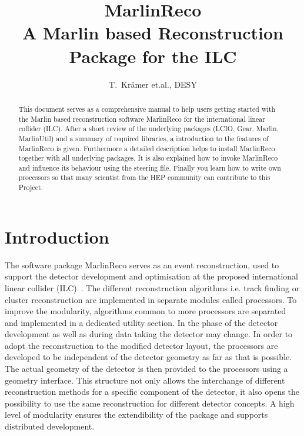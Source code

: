 \title{\huge{\bf MarlinReco}\\
             A Marlin based Reconstruction Package for the ILC}
\author{T.~Kr\"amer et.al., DESY}
\maketitle

\begin{abstract}
This document serves as a comprehensive manual to help
users getting started with the Marlin based reconstruction software MarlinReco
for the international linear collider (ILC).
After a short review of the underlying packages
(LCIO, Gear, Marlin, MarlinUtil) and a summary of required libraries,
a introduction to the features of MarlinReco is given.
Furthermore a detailed description helps to install MarlinReco
together with all underlying packages. It is also explained how
to invoke MarlinReco and influence its behaviour using the steering file.
Finally you learn how to write own processors so that many
scientist from the HEP community can contribute to this Project.
\end{abstract}
\newpage
\tableofcontents
\newpage

\section{Introduction}

The software package MarlinReco serves as an event reconstruction,
used to support the detector development and optimisation at
the proposed international linear collider (ILC)~\cite{ref_ilchome}.
The different reconstruction
algorithms i.e.
track finding or cluster reconstruction are implemented in separate modules
called processors. To improve the modularity, algorithms
common to more processors are separated and implemented in a dedicated
utility section. In the phase of the detector development as well as
during data taking the detector may change. In order to adopt
the reconstruction to the modified detector layout, the processors are
developed to be independent of the detector geometry as far as that is
possible. The actual geometry of the detector is then provided to the
processors using a geometry interface.
This structure not only allows the interchange of different
reconstruction methods for a specific component of the detector, it also opens
the possibility to use the same reconstruction for different
detector concepts. A high level of modularity ensures the
extendibility of the package and supports distributed development.

